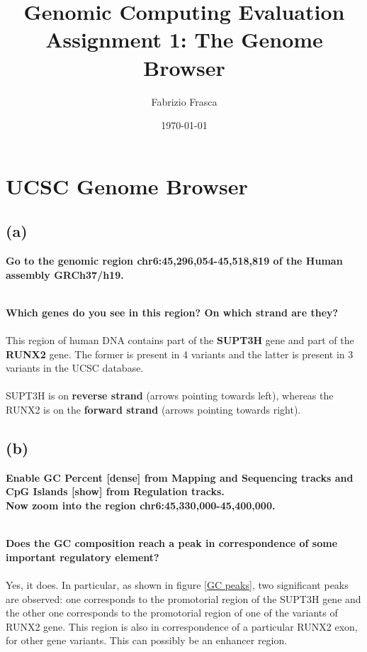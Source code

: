 \documentclass[12pt, a4paper]{article}
\title{\textbf{Genomic Computing Evaluation}\\Assignment 1: The Genome Browser}
\author{Fabrizio Frasca}
\date{\today}
\begin{document}
	
\maketitle
\clearpage

\section{UCSC Genome Browser}

\subsection*{(a)}

\textbf{Go to the genomic region chr6:45,296,054-45,518,819 of the Human assembly GRCh37/h19.}%

\textbf{\\ Which genes do you see in this region? On which strand are they?}%
\paragraph{} This region of human DNA contains part of the \textbf{SUPT3H} gene and part of the \textbf{RUNX2} gene. The former is present in 4 variants and the latter is present in 3 variants in the UCSC database.%
\paragraph{} SUPT3H is on \textbf{reverse strand} (arrows pointing towards left), whereas the RUNX2 is on the \textbf{forward strand} (arrows pointing towards right).	

\subsection*{(b)}

\textbf{Enable GC Percent [dense] from Mapping and Sequencing tracks and CpG Islands [show] from Regulation tracks.\\ Now zoom into the region chr6:45,330,000-45,400,000.}%

\textbf{\\ Does the GC composition reach a peak in correspondence of some important regulatory element?}%
\paragraph{}Yes, it does. In particular, as shown in figure \ref{GC peaks}, two significant peaks are observed: one corresponds to the promotorial region of the SUPT3H gene and the other one corresponds to the promotorial region of one of the variants of RUNX2 gene. This region is also in correspondence of a particular RUNX2 exon, for other gene variants. This can possibly be an enhancer region.
\end{document}
